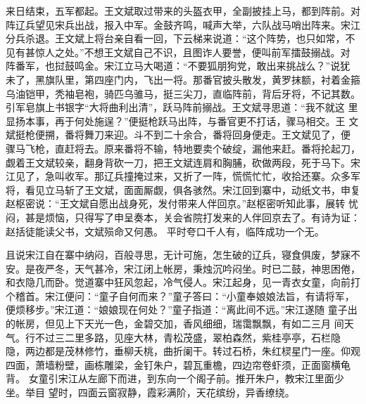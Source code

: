 来日结束，五军都起。王文斌取过带来的头盔衣甲，全副披挂上马，都到阵前。对
阵辽兵望见宋兵出战，报入中军。金鼓齐鸣，喊声大举，六队战马哨出阵来。宋江
分兵杀退。王文斌上将台亲自看一回，下云梯来说道：“这个阵势，也只如常，不
见有甚惊人之处。”不想王文斌自己不识，且图诈人要誉，便叫前军擂鼓搦战。对
阵番军，也挝鼓鸣金。宋江立马大喝道：“不要狐朋狗党，敢出来挑战么？”说犹
未了，黑旗队里，第四座门内，飞出一将。那番官披头散发，黄罗抹额，衬着金箍
乌油铠甲，秃袖皂袍，骑匹乌骓马，挺三尖刀，直临阵前，背后牙将，不记其数。
引军皂旗上书银字“大将曲利出清”，跃马阵前搦战。王文斌寻思道：“我不就这
里显扬本事，再于何处施逞？”便挺枪跃马出阵，与番官更不打话，骤马相交。王
文斌挺枪便搠，番将舞刀来迎。斗不到二十余合，番将回身便走。王文斌见了，便
骤马飞枪，直赶将去。原来番将不输，特地要卖个破绽，漏他来赶。番将抡起刀，
觑着王文斌较亲，翻身背砍一刀，把王文斌连肩和胸脯，砍做两段，死于马下。宋
江见了，急叫收军。那辽兵撞掩过来，又折了一阵，慌慌忙忙，收拾还寨。众多军
将，看见立马斩了王文斌，面面厮觑，俱各骇然。宋江回到寨中，动纸文书，申复
赵枢密说：“王文斌自愿出战身死，发付带来人伴回京。”赵枢密听知此事，展转
忧闷，甚是烦恼，只得写了申呈奏本，关会省院打发来的人伴回京去了。有诗为证：
赵括徒能读父书，文斌殒命又何愚。
平时夸口千人有，临阵成功一个无。

且说宋江自在寨中纳闷，百般寻思，无计可施，怎生破的辽兵，寝食俱废，梦寐不
安。是夜严冬，天气甚冷，宋江闭上帐房，秉烛沉吟闷坐。时已二鼓，神思困倦，
和衣隐几而卧。觉道寨中狂风忽起，冷气侵人。宋江起身，见一青衣女童，向前打
个稽首。宋江便问：“童子自何而来？”童子答曰：“小童奉娘娘法旨，有请将军，
便烦移步。”宋江道：“娘娘现在何处？”童子指道：“离此间不远。”宋江遂随
童子出的帐房，但见上下天光一色，金碧交加，香风细细，瑞霭飘飘，有如二三月
间天气。行不过三二里多路，见座大林，青松茂盛，翠柏森然，紫桂亭亭，石栏隐
隐，两边都是茂林修竹，垂柳夭桃，曲折阑干。转过石桥，朱红棂星门一座。仰观
四面，萧墙粉壁，画栋雕梁，金钉朱户，碧瓦重檐，四边帘卷虾须，正面窗横龟背。
女童引宋江从左廊下而进，到东向一个阁子前。推开朱户，教宋江里面少坐。举目
望时，四面云窗寂静，霞彩满阶，天花缤纷，异香缭绕。

